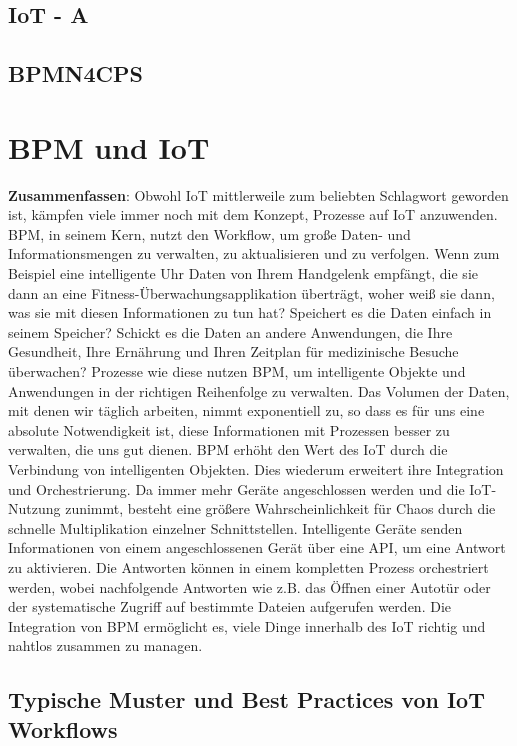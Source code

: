 \documentclass[a4paper, 12pt, twoside, headsepline=true]{scrartcl} %
\begin{document}
\subsection{IoT - A}

\subsection{BPMN4CPS}

\newpage

\section{BPM und IoT}
 \textbf{Zusammenfassen}:
Obwohl IoT mittlerweile zum beliebten Schlagwort geworden ist, kämpfen viele immer noch mit dem Konzept, Prozesse auf IoT anzuwenden. BPM, in seinem Kern, nutzt den Workflow, um große Daten- und Informationsmengen zu verwalten, zu aktualisieren und zu verfolgen. Wenn zum Beispiel eine intelligente Uhr Daten von Ihrem Handgelenk empfängt, die sie dann an eine Fitness-Überwachungsapplikation überträgt, woher weiß sie dann, was sie mit diesen Informationen zu tun hat? Speichert es die Daten einfach in seinem Speicher? Schickt es die Daten an andere Anwendungen, die Ihre Gesundheit, Ihre Ernährung und Ihren Zeitplan für medizinische Besuche überwachen? Prozesse wie diese nutzen BPM, um intelligente Objekte und Anwendungen in der richtigen Reihenfolge zu verwalten. Das Volumen der Daten, mit denen wir täglich arbeiten, nimmt exponentiell zu, so dass es für uns eine absolute Notwendigkeit ist, diese Informationen mit Prozessen besser zu verwalten, die uns gut dienen. BPM erhöht den Wert des IoT durch die Verbindung von intelligenten Objekten. Dies wiederum erweitert ihre Integration und Orchestrierung. Da immer mehr Geräte angeschlossen werden und die IoT-Nutzung zunimmt, besteht eine größere Wahrscheinlichkeit für Chaos durch die schnelle Multiplikation einzelner Schnittstellen. Intelligente Geräte senden Informationen von einem angeschlossenen Gerät über eine API, um eine Antwort zu aktivieren. Die Antworten können in einem kompletten Prozess orchestriert werden, wobei nachfolgende Antworten wie z.B. das Öffnen einer Autotür oder der systematische Zugriff auf bestimmte Dateien aufgerufen werden. Die Integration von BPM ermöglicht es, viele Dinge innerhalb des IoT richtig und nahtlos zusammen zu managen.

\subsection{Typische Muster und Best Practices von IoT Workflows}
\end{document}
